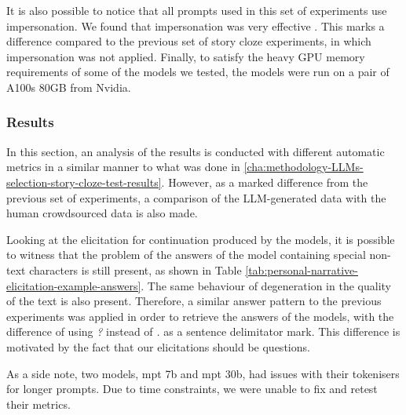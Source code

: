 It is also possible to notice that all prompts used in this set of experiments use impersonation. We found that impersonation was very effective \cite{impersonation}. This marks a difference compared to the previous set of story cloze experiments, in which impersonation was not applied. Finally, to satisfy the heavy GPU memory requirements of some of the models we tested, the models were run on a pair of A100s 80GB from Nvidia.
\subsubsection{Results}
\label{cha:methodology-personal-narrative-elicitation-results}
In this section, an analysis of the results is conducted with different automatic metrics in a similar manner to what was done in \ref{cha:methodology-LLMs-selection-story-cloze-test-results}. However, as a marked difference from the previous set of experiments, a comparison of the LLM-generated data with the human crowdsourced data is also made.


Looking at the elicitation for continuation produced by the models, it is possible to witness that the problem of the answers of the model containing special non-text characters is still present, as shown in Table \ref{tab:personal-narrative-elicitation-example-answers}. The same behaviour of degeneration in the quality of the text is also present. Therefore, a similar answer pattern to the previous experiments was applied in order to retrieve the answers of the models, with the difference of using \emph{?} instead of \emph{.} as a sentence delimitator mark. This difference is motivated by the fact that our elicitations should be questions.
% 

As a side note, two models, mpt 7b and mpt 30b, had issues with their tokenisers for longer prompts. Due to time constraints, we were unable to fix and retest their metrics.

